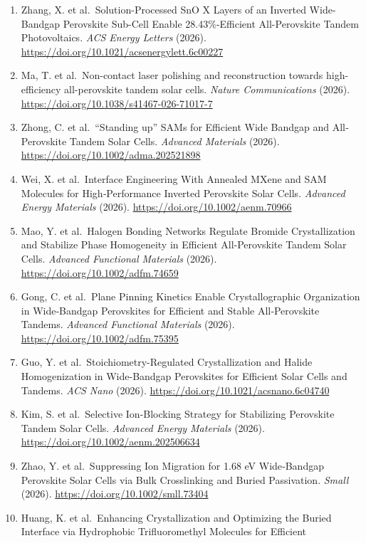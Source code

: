 \documentclass[
  11pt,
]{article}
\begin{document}
\begin{enumerate}
  \emph{Advanced Materials} (2026).
  \url{https://doi.org/10.1002/adma.202522790}
\item
  Zhang, X. et al.~Solution-Processed SnO X Layers of an Inverted
  Wide-Bandgap Perovskite Sub-Cell Enable 28.43\%-Efficient
  All-Perovskite Tandem Photovoltaics. \emph{ACS Energy Letters} (2026).
  \url{https://doi.org/10.1021/acsenergylett.6c00227}
\item
  Ma, T. et al.~Non-contact laser polishing and reconstruction towards
  high-efficiency all-perovskite tandem solar cells. \emph{Nature
  Communications} (2026).
  \url{https://doi.org/10.1038/s41467-026-71017-7}
\item
  Zhong, C. et al.~``Standing up'' SAMs for Efficient Wide Bandgap and
  All‐Perovskite Tandem Solar Cells. \emph{Advanced Materials} (2026).
  \url{https://doi.org/10.1002/adma.202521898}
\item
  Wei, X. et al.~Interface Engineering With Annealed MXene and SAM
  Molecules for High‐Performance Inverted Perovskite Solar Cells.
  \emph{Advanced Energy Materials} (2026).
  \url{https://doi.org/10.1002/aenm.70966}
\item
  Mao, Y. et al.~Halogen Bonding Networks Regulate Bromide
  Crystallization and Stabilize Phase Homogeneity in Efficient
  All‐Perovskite Tandem Solar Cells. \emph{Advanced Functional
  Materials} (2026). \url{https://doi.org/10.1002/adfm.74659}
\item
  Gong, C. et al.~Plane Pinning Kinetics Enable Crystallographic
  Organization in Wide‐Bandgap Perovskites for Efficient and Stable
  All‐Perovskite Tandems. \emph{Advanced Functional Materials} (2026).
  \url{https://doi.org/10.1002/adfm.75395}
\item
  Guo, Y. et al.~Stoichiometry-Regulated Crystallization and Halide
  Homogenization in Wide-Bandgap Perovskites for Efficient Solar Cells
  and Tandems. \emph{ACS Nano} (2026).
  \url{https://doi.org/10.1021/acsnano.6c04740}
\item
  Kim, S. et al.~Selective Ion‐Blocking Strategy for Stabilizing
  Perovskite Tandem Solar Cells. \emph{Advanced Energy Materials}
  (2026). \url{https://doi.org/10.1002/aenm.202506634}
\item
  Zhao, Y. et al.~Suppressing Ion Migration for 1.68 eV Wide‐Bandgap
  Perovskite Solar Cells via Bulk Crosslinking and Buried Passivation.
  \emph{Small} (2026). \url{https://doi.org/10.1002/smll.73404}
\item
  Huang, K. et al.~Enhancing Crystallization and Optimizing the Buried
  Interface via Hydrophobic Trifluoromethyl Molecules for Efficient

\end{enumerate}
\end{document}

